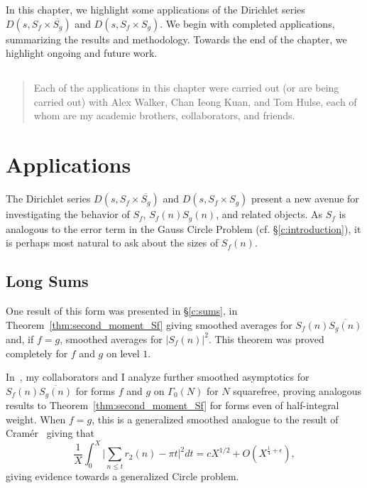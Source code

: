 
In this chapter, we highlight some applications of the Dirichlet series $D(s, S_f \times
\overline{S_g})$ and $D(s, S_f \times S_g)$.
We begin with completed applications, summarizing the results and methodology.
Towards the end of the chapter, we highlight ongoing and future work.


\vspace{-1in}
\subsection*{}

\begin{quote}
  Each of the applications in this chapter were carried out (or are being carried out)
  with Alex Walker, Chan Ieong Kuan, and Tom Hulse, each of whom are my academic brothers,
  collaborators, and friends.
\end{quote}




\section{Applications}


The Dirichlet series $D(s, S_f \times \overline{S_g})$ and $D(s, S_f \times S_g)$ present
a new avenue for investigating the behavior of $S_f$, $S_f(n)S_g(n)$, and related objects.
As $S_f$ is analogous to the error term in the Gauss Circle Problem (cf.
\S\ref{c:introduction}), it is perhaps most natural to ask about the sizes of $S_f(n)$.



\subsection*{Long Sums}


One result of this form was presented in \S\ref{c:sums}, in
Theorem~\ref{thm:second_moment_Sf} giving smoothed averages for $S_f(n)\overline{S_g(n)}$
and, if $f = g$, smoothed averages for $\lvert S_f(n) \rvert^2$.
This theorem was proved completely for $f$ and $g$ on level $1$.


In~\cite{hkldw}, my collaborators and I analyze further smoothed asymptotics for
$S_f(n)\overline{S_g(n)}$ for forms $f$ and $g$ on $\Gamma_0(N)$ for $N$ squarefree,
proving analogous results to Theorem~\ref{thm:second_moment_Sf} for forms even of
half-integral weight.
When $f = g$, this is a generalized smoothed analogue to the result of
Cram\'er~\cite{cramer1922} giving that
\begin{equation}
  \frac{1}{X} \int_0^X \Big \lvert \sum_{n \leq t} r_2(n) - \pi t \Big \rvert^2 dt = c
  X^{1/2} + O(X^{\frac{1}{4} + \epsilon}),
\end{equation}
giving evidence towards a generalized Circle problem.


